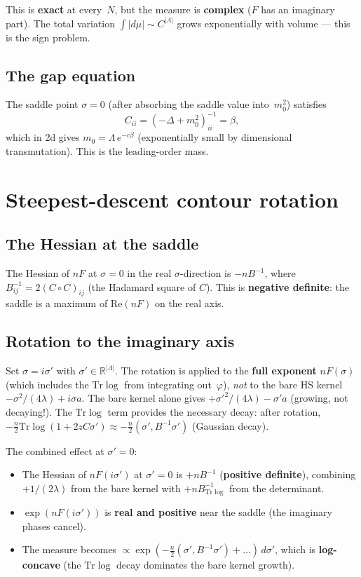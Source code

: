 \documentclass[12pt]{article}
\theoremstyle{definition}
\theoremstyle{remark}
\newcommand{\R}{\mathbb{R}}
\newcommand{\Tr}{\mathrm{Tr}}
\newcommand{\ph}{\varphi}
\newcommand{\La}{\Lambda}
\begin{document}
This is \textbf{exact} at every~$N$, but the measure is
\textbf{complex} ($F$ has an imaginary part). The total variation
$\int|d\mu| \sim C^{|\La|}$ grows exponentially with volume ---
this is the sign problem.

\subsection{The gap equation}

The saddle point $\sigma = 0$ (after absorbing the saddle value
into~$m_0^2$) satisfies
\begin{equation}
\label{eq:gap}
  C_{ii} = (-\Delta+m_0^2)^{-1}_{ii} = \beta,
\end{equation}
which in 2d gives $m_0 = \Lambda\,e^{-c\beta}$ (exponentially small
by dimensional transmutation). This is the leading-order mass.

\section{Steepest-descent contour rotation}

\subsection{The Hessian at the saddle}

The Hessian of $nF$ at $\sigma = 0$ in the real $\sigma$-direction is
$-nB^{-1}$, where $B^{-1}_{ij} = 2(C\circ C)_{ij}$ (the Hadamard
square of $C$). This is \textbf{negative definite}: the saddle is
a maximum of $\mathrm{Re}(nF)$ on the real axis.

\subsection{Rotation to the imaginary axis}

Set $\sigma = i\sigma'$ with $\sigma' \in \R^{|\La|}$. The rotation
is applied to the \textbf{full exponent} $nF(\sigma)$ (which includes
the $\Tr\log$ from integrating out~$\ph$), \emph{not} to the bare
HS kernel $-\sigma^2/(4\lambda)+i\sigma a$. The bare kernel alone
gives $+\sigma'^2/(4\lambda)-\sigma' a$ (growing, not decaying!).
The $\Tr\log$ term provides the necessary decay: after rotation,
$-\tfrac{n}{2}\Tr\log(1+2zC\sigma') \approx
-\tfrac{n}{2}(\sigma',B^{-1}\sigma')$ (Gaussian decay).

The combined effect at $\sigma'=0$:
\begin{itemize}
\item The Hessian of $nF(i\sigma')$ at $\sigma'=0$ is $+nB^{-1}$
  (\textbf{positive definite}), combining $+1/(2\lambda)$ from the
  bare kernel with $+nB^{-1}_{\Tr\log}$ from the determinant.
\item $\exp(nF(i\sigma'))$ is \textbf{real and positive} near the
  saddle (the imaginary phases cancel).
\item The measure becomes
  $\propto\exp(-\tfrac{n}{2}(\sigma',B^{-1}\sigma')+\ldots)\,d\sigma'$,
  which is \textbf{log-concave} (the $\Tr\log$ decay dominates the
  bare kernel growth).
\end{itemize}
\end{document}

